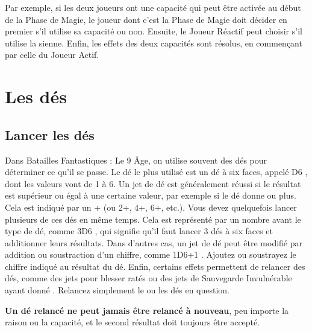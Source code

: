  Par exemple, si les deux joueurs ont une capacité qui peut être activée au début de la Phase de Magie, le joueur dont c'est la Phase de Magie doit décider en premier s'il utilise sa capacité ou non. Ensuite, le Joueur Réactif peut choisir s'il utilise la sienne. Enfin, les effets des deux capacités sont résolus, en commençant par celle du Joueur Actif.

\section{Les dés}

\subsection{Lancer les dés}

Dans Batailles Fantastiques : Le 9\ieme{} Âge, on utilise souvent des dés pour déterminer ce qu'il se passe. Le dé le plus utilisé est un dé à six faces, appelé \og D6 \fg{}, dont les valeurs vont de 1 à 6. Un jet de dé est généralement réussi si le résultat est supérieur ou égal à une certaine valeur, par exemple si le dé donne  ou plus. Cela est indiqué par un + \fg{} (ou 2+, 4+, 6+, etc.). Vous devez quelquefois lancer plusieurs de ces dés en même temps. Cela est représenté par un nombre avant le type de dé, comme \og 3D6 \fg{}, qui signifie qu'il faut lancer 3 dés à six faces et additionner leurs résultats. Dans d'autres cas, un jet de dé peut être modifié par addition ou soustraction d'un chiffre, comme \og 1D6+1 \fg{}. Ajoutez ou soustrayez le chiffre indiqué au résultat du dé. Enfin, certains effets permettent de relancer des dés, comme des jets pour blesser ratés ou des jets de Sauvegarde Invulnérable ayant donné . Relancez simplement le ou les dés en question.

\textbf{Un dé relancé ne peut jamais être relancé à nouveau}, peu importe la raison ou la capacité, et le second résultat doit toujours être accepté.

